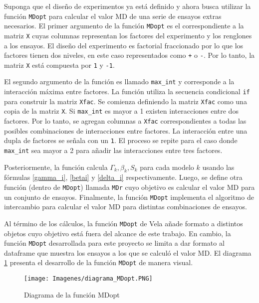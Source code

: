 Suponga que el diseño de experimentos ya está definido y ahora busca utilizar la función \texttt{MDopt} para calcular el valor MD de una serie de ensayos extras necesarios. El primer argumento de la función \texttt{MDopt} es el correspondiente a la matriz \texttt{X} cuyas columnas representan los factores del experimento y los renglones a los ensayos. El diseño del experimento es factorial fraccionado por lo que los factores tienen dos niveles, en este caso representados como \texttt{+} o \texttt{-}. Por lo tanto, la matriz \texttt{X} está compuesta por \texttt{1} y  \texttt{-1}. 

El segundo argumento de la función es llamado \texttt{max\_int} y corresponde a la interacción máxima entre factores. La función utiliza la secuencia condicional \texttt{if} para construir la matriz \texttt{Xfac}. Se comienza definiendo la matriz \texttt{Xfac} como una copia de la matriz \texttt{X}. Si \texttt{max\_int} es mayor a 1 existen interacciones entre dos factores. Por lo tanto, se agregan columnas a \texttt{Xfac} correspondientes a todas las posibles combinaciones de interacciones entre factores. La interacción entre una dupla de factores se señala con un \texttt{1}. El proceso se repite para el caso donde \texttt{max\_int} sea mayor a 2 para añadir las interacciones entre tres factores. 

Posteriormente, la función calcula $\Gamma_k, \beta_k, S_k$ para cada modelo $k$ usando las fórmulas \ref{gamma_i}, \ref{betai} y \ref{delta_i} respectivamente. Luego, se define otra función (dentro de \texttt{MDopt}) llamada \texttt{MDr} cuyo objetivo es calcular el valor MD para un conjunto de ensayos. Finalmente, la función \texttt{MDopt} implementa el algoritmo de intercambio para calcular el valor MD para distintas combinaciones de ensayos.

Al término de los cálculos, la función \texttt{MDopt} de Vela añade formato a distintos objetos cuyo objetivo está fuera del alcance de este trabajo. En cambio, la función \texttt{MDopt} desarrollada para este proyecto se limita a dar formato al dataframe que muestra los ensayos a los que se calculó el valor MD. El diagrama \ref{diagrama_mdopt} presenta el desarrollo de la función \texttt{MDopt} de manera visual. 

\begin{figure}[h]
	\begin{center} 
		\texttt{[image: Imagenes/diagrama\_MDopt.PNG]}
		\caption{Diagrama de la función MDopt}
		\label{diagrama_mdopt}
	\end{center}
\end{figure} 

